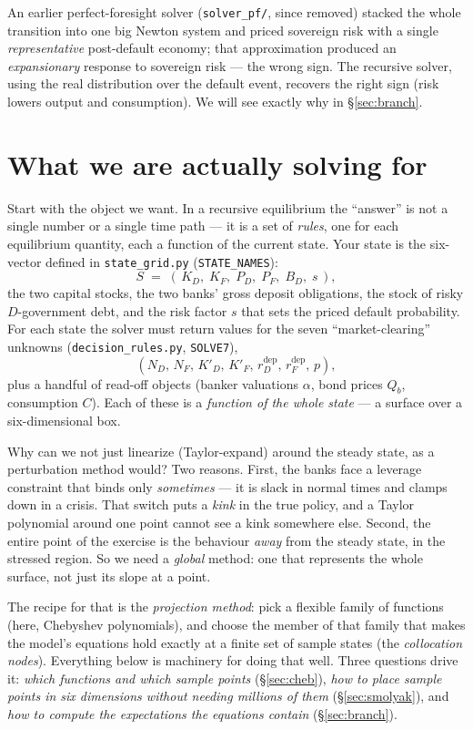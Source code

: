 \documentclass[11pt]{article}
\newcommand{\code}[1]{\texttt{#1}}
\begin{document}
An earlier perfect-foresight solver (\code{solver\_pf/}, since removed) stacked
the whole transition into one big Newton system and priced sovereign risk with a
single \emph{representative} post-default economy; that approximation produced an
\emph{expansionary} response to sovereign risk --- the wrong sign. The recursive
solver, using the real distribution over the default event, recovers the right
sign (risk lowers output and consumption). We will see exactly why in
\S\ref{sec:branch}.


\section{What we are actually solving for}
\label{sec:what}

Start with the object we want. In a recursive equilibrium the ``answer'' is
not a single number or a single time path --- it is a set of \emph{rules},
one for each equilibrium quantity, each a function of the current state.
Your state is the six-vector defined in
\code{state\_grid.py} (\code{STATE\_NAMES}):
\[
S \;=\; (\,K_D,\;K_F,\;P_D,\;P_F,\;B_D,\;s\,),
\]
the two capital stocks, the two banks' gross deposit obligations, the stock
of risky $D$-government debt, and the risk factor $s$ that sets the priced
default probability. For each state the solver must return values for the
seven ``market-clearing'' unknowns (\code{decision\_rules.py},
\code{SOLVE7}),
\[
(N_D,\,N_F,\,K'_D,\,K'_F,\,r^{\text{dep}}_D,\,r^{\text{dep}}_F,\,p),
\]
plus a handful of read-off objects (banker valuations $\alpha$, bond prices
$Q_b$, consumption $C$). Each of these is a \emph{function of the whole
state} --- a surface over a six-dimensional box.

Why can we not just linearize (Taylor-expand) around the steady state, as a
perturbation method would? Two reasons. First, the banks face a leverage
constraint that binds only \emph{sometimes} --- it is slack in normal times
and clamps down in a crisis. That switch puts a \emph{kink} in the true
policy, and a Taylor polynomial around one point cannot see a kink somewhere
else. Second, the entire point of the exercise is the behaviour \emph{away}
from the steady state, in the stressed region. So we need a \emph{global}
method: one that represents the whole surface, not just its slope at a
point.

The recipe for that is the \emph{projection method}: pick a flexible family
of functions (here, Chebyshev polynomials), and choose the member of that
family that makes the model's equations hold exactly at a finite set of
sample states (the \emph{collocation nodes}). Everything below is machinery
for doing that well. Three questions drive it:
\emph{which functions and which sample points} (\S\ref{sec:cheb}),
\emph{how to place sample points in six dimensions without needing millions
of them} (\S\ref{sec:smolyak}), and
\emph{how to compute the expectations the equations contain}
(\S\ref{sec:branch}).
\end{document}
